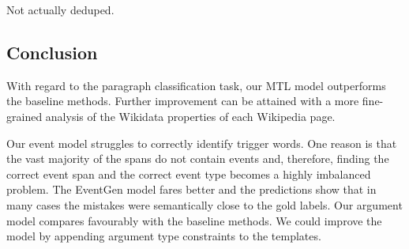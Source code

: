 \documentclass[runningheads]{llncs}
\begin{document}
Not actually deduped.

\subsection{Conclusion}

With regard to the paragraph classification task, our MTL model outperforms the baseline methods. Further improvement can be attained with a more fine-grained analysis of the Wikidata properties of each Wikipedia page.

Our event model struggles to correctly identify trigger words. One reason is that the vast majority of the spans do not contain events and, therefore, finding the correct event span and the correct event type becomes a highly imbalanced problem. The EventGen model fares better and the predictions show that in many cases the mistakes were semantically close to the gold labels. Our argument model compares favourably with the baseline methods. We could improve the model by appending argument type constraints to the templates.



\end{document}
